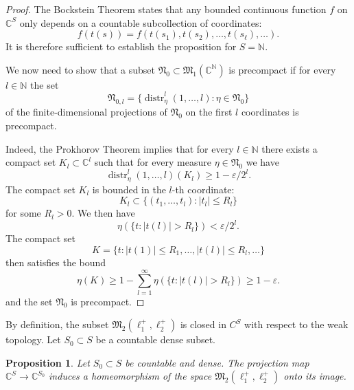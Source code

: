 \documentclass[12pt,a4paper]{article}
\newtheorem{proposition}[theorem]{Proposition}
\theoremstyle{definition}
\theoremstyle{remark}
\newcommand{\MM}{{\mathfrak{M}}}
\newcommand{\NN}{{\mathfrak{N}}}
\begin{document}
	\begin{proof}
		The Bockstein Theorem \cite{Bockstein} states that any bounded continuous function $f$ on $\mathbb{C}^S$
		only depends on a countable subcollection of coordinates:
		\[
		f(t(s)) = f(t(s_1), t(s_2), \ldots, t(s_\ell), \ldots).
		\]
		It is therefore sufficient to establish the proposition for $S = \mathbb{N}$.
		
		We now need to show that a subset $\NN_0 \subset \MM_1(\mathbb{C}^{\mathbb{N}})$ is precompact if for every $l \in \mathbb{N}$
		the set
		\[
		\NN_{0,l} = \{\operatorname{distr}^l_{\eta}(1, \ldots, l) : \eta \in \NN_0\}
		\]
		of the finite-dimensional projections of $\NN_0$ on the first $l$ coordinates is precompact.
		
		Indeed, the Prokhorov Theorem implies that for every $l \in \mathbb{N}$ there exists a compact set $K_l \subset \mathbb{C}^l$
		such that for every measure $\eta \in \NN_0$ we have
		\[
		\operatorname{distr}^l_{\eta}(1, \ldots, l)(K_l) \ge 1 - \varepsilon/2^l.
		\]
		The compact set $K_l$ is bounded in the $l$-th coordinate:
		\[
		K_l \subset \{(t_1, \ldots, t_l) : |t_l| \le R_l\}
		\]
		for some $R_l > 0$. We then have
		\[
		\eta(\{t : |t(l)| > R_l\}) < \varepsilon/2^l.
		\]
		The compact set
		\[
		K = \{ t : |t(1)| \le R_1, \ldots, |t(l)| \le R_l, \ldots \}
		\]
		then satisfies the bound
		\[
		\eta(K) \ge 1 - \sum_{l=1}^{\infty} \eta(\{ t : |t(l)| > R_l \}) \ge 1 - \varepsilon.
		\]
		and the set $\NN_0$ is precompact.
	\end{proof}
	
	By definition, the subset $\MM_2(\ell_1^+, \ell_2^+)$ is closed in $C^S$ with respect to the weak topology. Let $S_0 \subset S$ be a countable dense subset.
	
	\begin{proposition}
		\label{prop:4.3}
		Let $S_0 \subset S$ be countable and dense. The projection map $\mathbb{C}^S \to \mathbb{C}^{S_0}$ induces a homeomorphism
		of the space $\MM_2(\ell_1^+, \ell_2^+)$ onto its image.
	\end{proposition}
	
\end{document}
